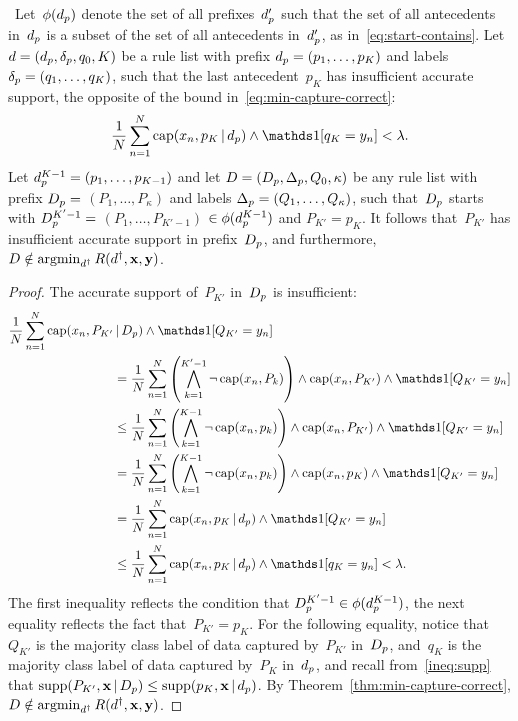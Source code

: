 \begin{arxiv}
\begin{proposition}
\label{prop:min-capture-correct}
~Let~$\phi(d_p)$ denote the set of all
prefixes~$d_p'$ such that
the set of all antecedents in~$d_p$ is a subset of
the set of all antecedents in~$d_p'$,
as in~\eqref{eq:start-contains}.
%
Let ${{d} = (d_p, \delta_p, q_0, K)}$ be a rule list
with prefix ${d_p = (p_1, \dots, p_{K})}$
and labels ${\delta_p = (q_1, \dots, q_{K})}$, such that
the last antecedent~$p_{K}$ has insufficient accurate support,
\ie the opposite of the bound in~\eqref{eq:min-capture-correct}:
\begin{align}
\frac{1}{N} \sum_{n=1}^N \Cap(x_n, p_K \given \Prefix) \wedge \one [ q_K = y_n ]
< \Reg.
\end{align}
%
Let ${d_p^{K-1} = (p_1, \dots, p_{K-1})}$
and let ${{D} = (D_p, \Delta_p, Q_0, \kappa)}$
be any rule list with prefix ${D_p =}$ ${(P_1, \dots, P_{\kappa})}$
and labels ${\Delta_p = (Q_1, \dots, Q_{\kappa})}$,
such that~$D_p$ starts with ${D_p^{K'-1} =}$
${(P_1, \dots, P_{K'-1})}$ ${\in \phi(d_p^{K-1})}$
and ${P_{K'} = p_{K}}$.
%
It follows that~$P_{K'}$ has insufficient accurate support in
prefix~$D_p$, and furthermore,
${{D} \notin \operatorname*{argmin}_{{d}^\dagger} R({d}^\dagger, \mathbf{x}, \mathbf{y})}$.
\end{proposition}

\begin{proof}
The accurate support of~$P_{K'}$ in~$D_p$ is insufficient:
\begin{align}
\frac{1}{N} \sum_{n=1}^N \Cap(x_n, P_{K'} &\given \PrefixB) \wedge \one [ Q_{K'} = y_n ] \nn \\
&= \frac{1}{N} \sum_{n=1}^N \left( \bigwedge_{k=1}^{K'-1} \neg\, \Cap(x_n, P_k) \right)
   \wedge \Cap(x_n, P_{K'}) \wedge \one [ Q_{K'} = y_n ] \nn \\
&\le \frac{1}{N} \sum_{n=1}^N \left( \bigwedge_{k=1}^{K-1} \neg\, \Cap(x_n, p_k) \right)
   \wedge \Cap(x_n, P_{K'}) \wedge \one [ Q_{K'} = y_n ] \nn \\
&= \frac{1}{N} \sum_{n=1}^N \left( \bigwedge_{k=1}^{K-1} \neg\, \Cap(x_n, p_k) \right)
   \wedge \Cap(x_n, p_K) \wedge \one [ Q_{K'} = y_n ] \nn \\
&= \frac{1}{N} \sum_{n=1}^N \Cap(x_n, p_K \given \Prefix) \wedge \one [ Q_{K'} = y_n ] \nn \\
&\le \frac{1}{N} \sum_{n=1}^N \Cap(x_n, p_K \given \Prefix) \wedge \one [ q_{K} = y_n ]
< \Reg.
\end{align}
The first inequality reflects the condition that
${D_p^{K'-1} \in \phi(d_p^{K-1})}$,
the next equality reflects the fact that~${P_{K'} = p_K}$.
%
For the following equality, notice that~$Q_{K'}$ is the majority
class label of data captured by~$P_{K'}$ in~$D_p$, and~$q_K$
is the majority class label of data captured by~$P_K$ in~$d_p$,
and recall from~\eqref{ineq:supp} that
${\textnormal{supp}(P_{K'}, \mathbf{x} \,|\, D_p) \le \textnormal{supp}(p_{K}, \mathbf{x} \,|\, d_p)}$.
%
By Theorem~\ref{thm:min-capture-correct},
${{D} \notin \operatorname*{argmin}_{{d}^\dagger} R({d}^\dagger, \mathbf{x}, \mathbf{y})}$.
\end{proof}


\end{arxiv}
